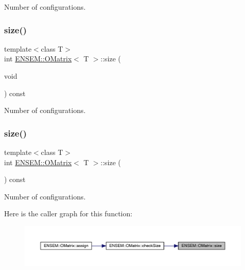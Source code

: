 Number of configurations. 

\mbox{\label{classENSEM_1_1OMatrix_a837821b951450cd49d3db25f566f5e47}} 
\subsubsection{\texorpdfstring{size()}{size()}\hspace{0.1cm}{\footnotesize\ttfamily [2/3]}}
{\footnotesize\ttfamily template$<$class T$>$ \\
int \mbox{\hyperlink{classENSEM_1_1OMatrix}{E\+N\+S\+E\+M\+::\+O\+Matrix}}$<$ T $>$\+::size (\begin{DoxyParamCaption}\item[{void}]{ }\end{DoxyParamCaption}) const\hspace{0.3cm}{\ttfamily [inline]}}



Number of configurations. 

\mbox{\label{classENSEM_1_1OMatrix_a837821b951450cd49d3db25f566f5e47}} 
\subsubsection{\texorpdfstring{size()}{size()}\hspace{0.1cm}{\footnotesize\ttfamily [3/3]}}
{\footnotesize\ttfamily template$<$class T$>$ \\
int \mbox{\hyperlink{classENSEM_1_1OMatrix}{E\+N\+S\+E\+M\+::\+O\+Matrix}}$<$ T $>$\+::size (\begin{DoxyParamCaption}{ }\end{DoxyParamCaption}) const\hspace{0.3cm}{\ttfamily [inline]}}



Number of configurations. 

Here is the caller graph for this function\+:
\nopagebreak
\begin{figure}[H]
\begin{center}
\leavevmode
\includegraphics[width=350pt]{dd/d80/classENSEM_1_1OMatrix_a837821b951450cd49d3db25f566f5e47_icgraph}
\end{center}
\end{figure}
\mbox{\label{classENSEM_1_1OMatrix_a850b4d2a93be69f82df4a2d0165bc397}} 
